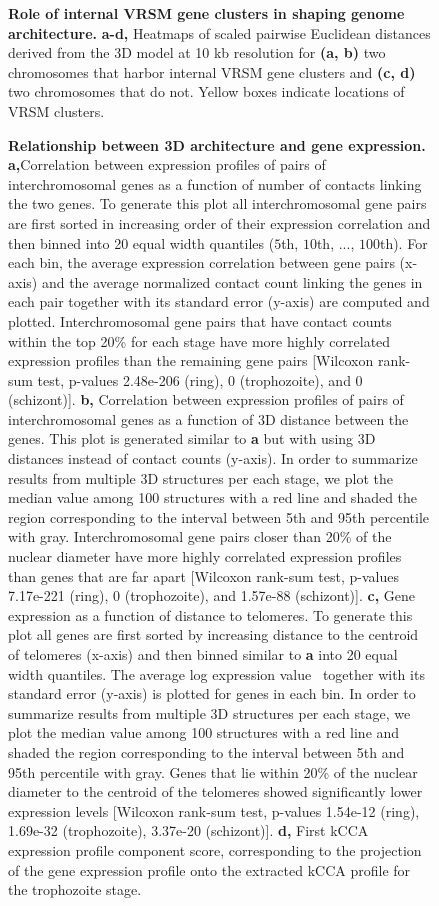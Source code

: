   \begin{figure}[h]
  \centering
  \caption{{\bf Role of internal VRSM gene clusters in shaping genome
  architecture.}
   \textbf{a-d,} Heatmaps of scaled pairwise Euclidean distances derived from
   the 3D model at 10 kb resolution for \textbf{(a, b)} two chromosomes that
   harbor internal VRSM gene clusters and \textbf{(c, d)} two chromosomes that
   do not. Yellow boxes indicate locations of VRSM clusters. }
   \label{fig:fig5}
   \end{figure}


\begin{figure}[h]
\centering
\caption{{\bf Relationship between 3D architecture and gene expression.}
\textbf{a,}Correlation between expression profiles of pairs of
interchromosomal genes as a function of number of contacts linking the two
genes. To generate this plot all interchromosomal gene pairs are first sorted
in increasing order of their expression correlation and then binned into 20
equal width quantiles ($5$th, $10$th, ..., $100$th). For each bin, the average
expression correlation between gene pairs (x-axis) and the average normalized
contact count linking the genes in each pair together with its standard error
(y-axis) are computed and plotted. Interchromosomal gene pairs that have
contact counts within the top 20\% for each stage have more highly correlated
expression profiles than the remaining gene pairs [Wilcoxon rank-sum test,
p-values 2.48e-206 (ring), 0 (trophozoite), and 0 (schizont)].
\textbf{b,} Correlation between expression profiles of pairs of
interchromosomal genes as a function of 3D distance between the genes. This
plot is generated similar to \textbf{a} but with using 3D distances instead of
contact counts (y-axis). In order to summarize results from multiple 3D
structures per each stage, we plot the median value among 100 structures with
a red line and shaded the region corresponding to the interval between 5th and
95th percentile with gray. Interchromosomal gene pairs closer than 20\% of the
nuclear diameter have more highly correlated expression profiles than genes
that are far apart [Wilcoxon rank-sum test, p-values 7.17e-221 (ring), 0
(trophozoite), and 1.57e-88 (schizont)].
\textbf{c,} Gene expression as a function of distance to telomeres. To
generate this plot all genes are first sorted by increasing distance to the
centroid of telomeres (x-axis) and then binned similar to \textbf{a} into 20
equal width quantiles. The average log expression
value~\citep{bunnik:polysome}
together with its standard error (y-axis) is plotted for genes in each bin. In
order to summarize results from multiple 3D structures per each stage, we plot
the median value among 100 structures with a red line and shaded the region
corresponding to the interval between 5th and 95th percentile with gray. Genes
that lie within 20\% of the nuclear diameter to the centroid of the telomeres
showed significantly lower expression levels [Wilcoxon rank-sum test, p-values
1.54e-12 (ring), 1.69e-32 (trophozoite), 3.37e-20 (schizont)].
\textbf{d,} First kCCA expression profile component score, corresponding to
the projection of the gene expression profile onto the extracted kCCA profile
for the trophozoite stage.}
\label{fig:fig6}
\end{figure}


